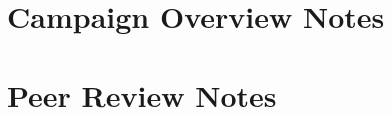 

\section{Campaign Overview Notes}
\label{vol3:sec:ssrn:notes}



\section{Peer Review Notes}
\label{vol3:sec:ssrn:peerreview}

